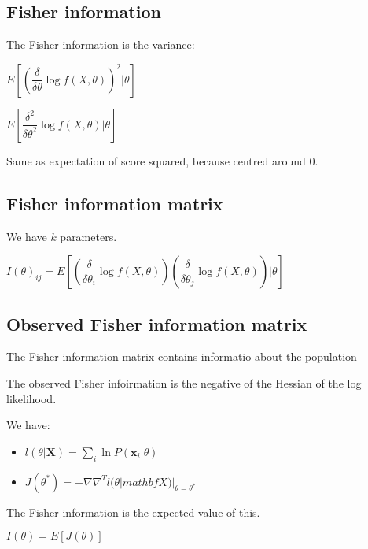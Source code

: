 
\subsection{Fisher information}

The Fisher information is the variance:

\(E[(\dfrac{\delta }{\delta \theta }\log f(X, \theta ))^2 |\theta ]\)

\(E[\dfrac{\delta^2 }{\delta \theta^2 }\log f(X, \theta ) |\theta ]\)

Same as expectation of score squared, because centred around \(0\).

\subsection{Fisher information matrix}

We have \(k\) parameters.

\(I(\theta )_{ij}=E[(\dfrac{\delta }{\delta \theta_i}\log f(X, \theta ))(\dfrac{\delta }{\delta \theta_j }\log f(X, \theta ))|\theta ]\)

\subsection{Observed Fisher information matrix}

The Fisher information matrix contains informatio about the population

The observed Fisher infoirmation is the negative of the Hessian of the log likelihood.

We have:

\begin{itemize}
\item \(l(\theta |\mathbf X)=\sum_i\ln P(\mathbf x_i|\theta )\)
\item \(J(\theta^*)=-\nabla \nabla^Tl(\theta|mathbf X )|_{\theta = \theta^*}\)
\end{itemize}

The Fisher information is the expected value of this.

\(I(\theta )=E[J(\theta)]\)


